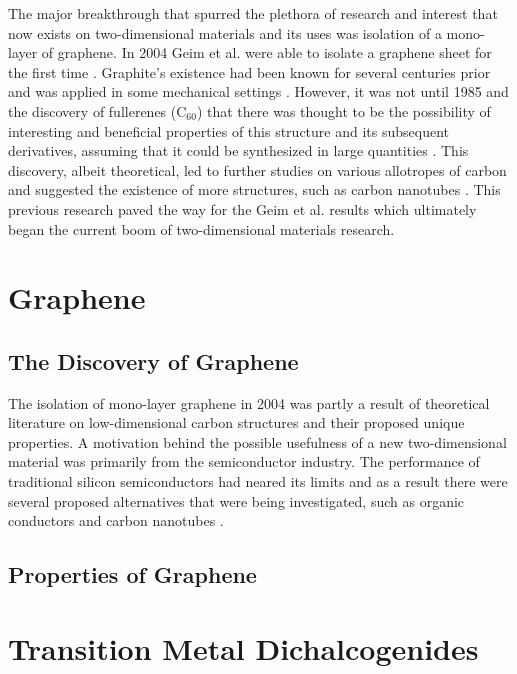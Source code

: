 \documentclass[%
 reprint,
 amsmath,amssymb,
 aps,
pra,
]{revtex4-1}
\begin{document}
The major breakthrough that spurred the plethora of research and interest that now exists on two-dimensional materials and its uses was isolation of a mono-layer of graphene. In 2004 Geim et al. were able to isolate a graphene sheet for the first time \cite{novoselovEtAl2004, novoselovEtAl2005}. Graphite's existence had been known for several centuries prior and was applied in some mechanical settings \cite{nanoscaleReview2011}. However, it was not until 1985 and the discovery of fullerenes ($\mathrm{C}_{60}$) that there was thought to be the possibility of interesting and beneficial properties of this structure and its subsequent derivatives, assuming that it could be synthesized in large quantities \cite{krotoFullerenes1985}. This discovery, albeit theoretical, led to further studies on various allotropes of carbon and suggested the existence of more structures, such as carbon nanotubes \cite{iijimaCarbonNanotubes1991}. This previous research paved the way for the Geim et al. results which ultimately began the current boom of two-dimensional materials research.

\section{\label{sec:graphene_properties} Graphene}
\subsection{\label{subsec:discovery} The Discovery of Graphene}
The isolation of mono-layer graphene in 2004 was partly a result of theoretical literature on low-dimensional carbon structures and their proposed unique properties. A motivation behind the possible usefulness of a new two-dimensional material was primarily from the semiconductor industry. The performance of traditional silicon semiconductors had neared its limits and as a result there were several proposed alternatives that were being investigated, such as organic conductors and carbon nanotubes \cite{novoselovEtAl2004, mascaro2001, Baughman2002}.

\subsection{\label{subsec:properties_graphene} Properties of Graphene}

\section{\label{sec:TMDs} Transition Metal Dichalcogenides}
\end{document}
